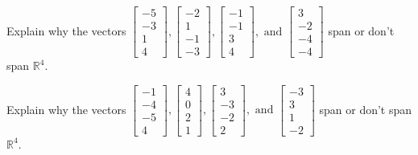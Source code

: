 \documentclass{article}
\begin{document}
\begin{exerciseStatement}
    Explain why the vectors \(\left[\begin{array}{r}
-5 \\
-3 \\
1 \\
4
\end{array}\right] , \left[\begin{array}{r}
-2 \\
1 \\
-1 \\
-3
\end{array}\right] , \left[\begin{array}{r}
-1 \\
-1 \\
3 \\
4
\end{array}\right] , \text{ and } \left[\begin{array}{r}
3 \\
-2 \\
-4 \\
-4
\end{array}\right]\) span or don't span \(\mathbb{R}^4\).



  
\end{exerciseStatement}

\begin{exerciseStatement}
    Explain why the vectors \(\left[\begin{array}{r}
-1 \\
-4 \\
-5 \\
4
\end{array}\right] , \left[\begin{array}{r}
4 \\
0 \\
2 \\
1
\end{array}\right] , \left[\begin{array}{r}
3 \\
-3 \\
-2 \\
2
\end{array}\right] , \text{ and } \left[\begin{array}{r}
-3 \\
3 \\
1 \\
-2
\end{array}\right]\) span or don't span \(\mathbb{R}^4\).



  
\end{exerciseStatement}
\end{document}
